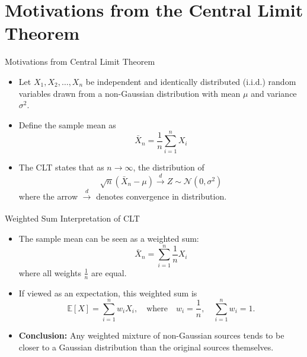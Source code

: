 \documentclass{beamer}
\begin{document}
\section{Motivations from the Central Limit Theorem}

\begin{frame}{Motivations from Central Limit Theorem}
\begin{itemize}
    \item Let \( X_1, X_2, \ldots, X_n \) be independent and identically distributed (i.i.d.) random variables drawn from a non-Gaussian distribution with mean \( \mu \) and variance \( \sigma^2 \).
    \item Define the sample mean as
    \[
        \bar{X}_n = \frac{1}{n} \sum_{i=1}^{n} X_i
    \]
    \item The CLT states that as \( n \to \infty \), the distribution of
    \[
        \sqrt{n} \left(\bar{X}_n - \mu \right) 
        \xrightarrow[]{\,d\,} 
        Z \sim \mathcal{N}(0, \sigma^2)
    \]
    where the arrow \(\xrightarrow[]{d}\) denotes convergence in distribution.
\end{itemize}
\end{frame}


\begin{frame}{Weighted Sum Interpretation of CLT}
\begin{itemize}
    \item The sample mean can be seen as a weighted sum:
    \[
        \bar{X}_n = \sum_{i=1}^{n} \frac{1}{n} X_i
    \]
    where all weights \( \frac{1}{n} \) are equal.
    \item If viewed as an expectation, this weighted sum is
    \[
        \mathbb{E}[X] = \sum_{i=1}^{n} w_i X_i, \quad \text{where} \quad w_i = \frac{1}{n}, \quad \sum_{i=1}^n w_i = 1.
    \]
    \item \textbf{Conclusion:} Any weighted mixture of non-Gaussian sources tends to be closer to a Gaussian distribution than the original sources themselves.
\end{itemize}
\end{frame}
\end{document}
